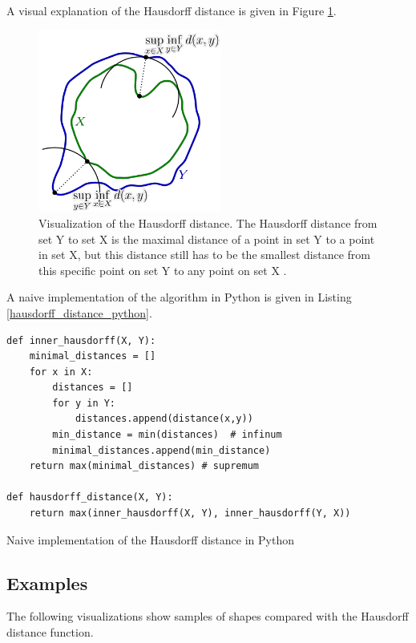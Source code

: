A visual explanation of the Hausdorff distance is given in Figure \ref{hausdorff_distance}.

\begin{figure}[H]
\centering
\includegraphics[width=6cm]{chapters/06_hdm/images/hausdorff_distance.png}
\caption{Visualization of the Hausdorff distance. The Hausdorff distance from set Y to set X is the maximal distance of a point in set Y to a point in set X, but this distance still has to be the smallest distance from this specific point on set Y to any point on set X \cite{hausdorffdistanceimage}.}
\label{hausdorff_distance}
\end{figure}

A naive implementation of the algorithm in Python is given in Listing \ref{hausdorff_distance_python}.

\begin{listing}[H]
\begin{verbatim}
def inner_hausdorff(X, Y):
    minimal_distances = []
    for x in X:
        distances = []
        for y in Y:
            distances.append(distance(x,y))
        min_distance = min(distances)  # infinum
        minimal_distances.append(min_distance)
    return max(minimal_distances) # supremum

def hausdorff_distance(X, Y):
    return max(inner_hausdorff(X, Y), inner_hausdorff(Y, X))
\end{verbatim}
\caption{Naive implementation of the Hausdorff distance in Python}
\label{hausdorff_distance_python}
\end{listing}

\clearpage

\subsection{Examples}
The following visualizations show samples of shapes compared with the Hausdorff distance function.

